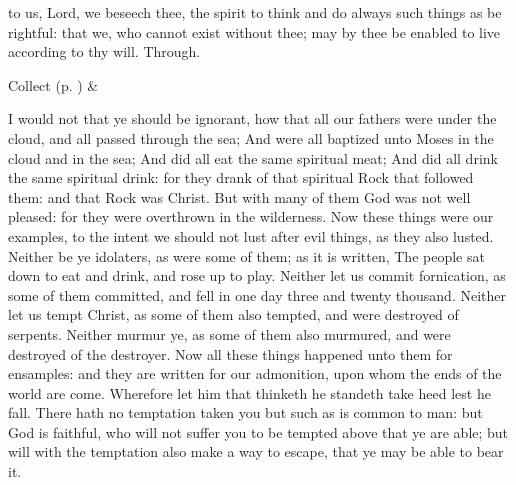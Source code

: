 \vspace{-0.55\baselineskip}

\collect

\vspace{-0.15\baselineskip}

 to us, Lord, we beseech thee, the spirit to think and do always such things as be rightful: that we, who cannot exist without thee; may by thee be enabled to live according to thy will. Through.
\begin{rubric}
     Collect  (p. \pageref{SPSaints}) \&  
\end{rubric}

\vspace{-0.5\baselineskip}


\vspace{-0.1\baselineskip}

 I would not that ye should be ignorant, how that all our fathers were under the cloud, and all passed through the sea; And were all baptized unto Moses in the cloud and in the sea; And did all eat the same spiritual meat; And did all drink the same spiritual drink: for they drank of that spiritual Rock that followed them: and that Rock was Christ. But with many of them God was not well pleased: for they were overthrown in the wilderness. Now these things were our examples, to the intent we should not lust after evil things, as they also lusted. Neither be ye idolaters, as were some of them; as it is written, The people sat down to eat and drink, and rose up to play. Neither let us commit fornication, as some of them committed, and fell in one day three and twenty thousand. Neither let us tempt Christ, as some of them also tempted, and were destroyed of serpents. Neither murmur ye, as some of them also murmured, and were destroyed of the destroyer. Now all these things happened unto them for ensamples: and they are written for our admonition, upon whom the ends of the world are come. Wherefore let him that thinketh he standeth take heed lest he fall. There hath no temptation taken you but such as is common to man: but God is faithful, who will not suffer you to be tempted above that ye are able; but will with the temptation also make a way to escape, that ye may be able to bear it.


